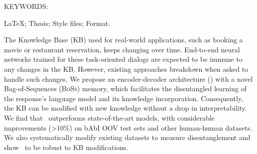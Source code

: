 \noindent KEYWORDS: \hspace*{0.5em} \parbox[t]{4.4in}{\LaTeX ; Thesis;
  Style files; Format.}

\vspace*{24pt}

\noindent The Knowledge Base (KB) used for real-world applications, such as booking a movie or restaurant reservation, keeps changing over time. End-to-end neural networks trained for these task-oriented dialogs are expected to be immune to any changes in the KB. However, existing approaches breakdown when asked to handle such changes. We propose an encoder-decoder architecture (\sys) with a novel Bag-of-Sequences (\textsc{BoSs}) memory, which facilitates the disentangled learning of the response's language model and its knowledge incorporation. Consequently, the KB can be modified with new knowledge without a drop in interpretability. We find that \sys\ outperforms state-of-the-art models, with considerable improvements (\textgreater10\%) on bAbI OOV test sets and other human-human datasets. We also systematically modify existing datasets to measure disentanglement and show \sys\ to be robust to KB modifications.